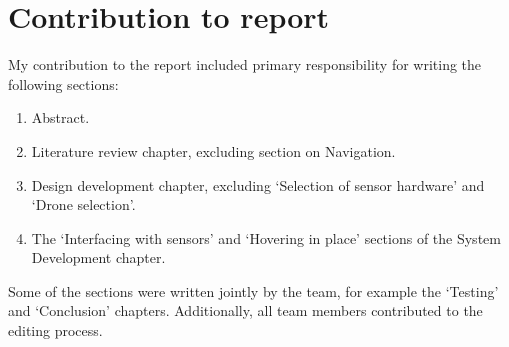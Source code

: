 \documentclass{article}
\begin{document}
\section{Contribution to report}
My contribution to the report included primary responsibility for writing the following sections:
\begin{enumerate}
    \item Abstract.
    \item Literature review chapter, excluding section on Navigation.
    \item Design development chapter, excluding `Selection of sensor hardware' and `Drone selection'.
    \item The `Interfacing with sensors' and `Hovering in place' sections of the System Development chapter.
\end{enumerate}

Some of the sections were written jointly by the team, for example the `Testing' and `Conclusion' chapters. Additionally, all team members contributed to the editing process.
\end{document}
